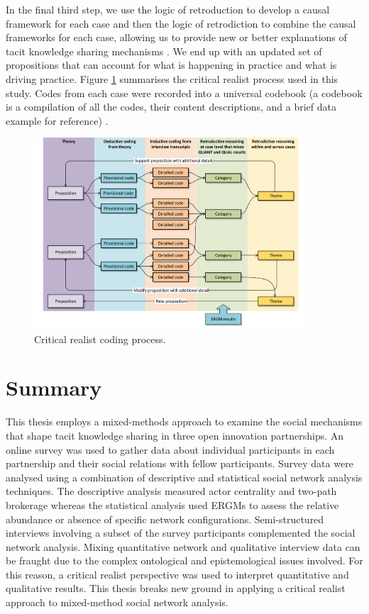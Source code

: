 In the final third step, we use the logic of retroduction to develop a causal framework for each case and then the logic of retrodiction to combine the causal frameworks for each case, allowing us to provide new or better explanations of tacit knowledge sharing mechanisms \citep{mcavoy2018critical}. We end up with an updated set of propositions that can account for what is happening in practice and what is driving practice. Figure \ref{fig:coding_process} summarises the critical realist process used in this study. Codes from each case were recorded into a universal codebook (a codebook is a compilation of all the codes, their content descriptions, and a brief data example for reference) \citep{guest2011applied}. 


\begin{figure}
\centering
\includegraphics[width = 0.9\textwidth,
height = 0.7\textheight, keepaspectratio]{Images/CR.pdf}
\caption[Critical realist coding process]{Critical realist coding process.}
\label{fig:coding_process}
\end{figure}

\section{Summary}

This thesis employs a mixed-methods approach to examine the social mechanisms that shape tacit knowledge sharing in three open innovation partnerships. An online survey was used to gather data about individual participants in each partnership and their social relations with fellow participants. Survey data were analysed using a combination of descriptive and statistical social network analysis techniques. The descriptive analysis measured actor centrality and two-path brokerage whereas the statistical analysis used ERGMs to assess the relative abundance or absence of specific network configurations. Semi-structured interviews involving a subset of the survey participants complemented the social network analysis. Mixing quantitative network and qualitative interview data can be fraught due to the complex ontological and epistemological issues involved. For this reason, a critical realist perspective was used to interpret quantitative and qualitative results. This thesis breaks new ground in applying a critical realist approach to mixed-method social network analysis. \medskip

